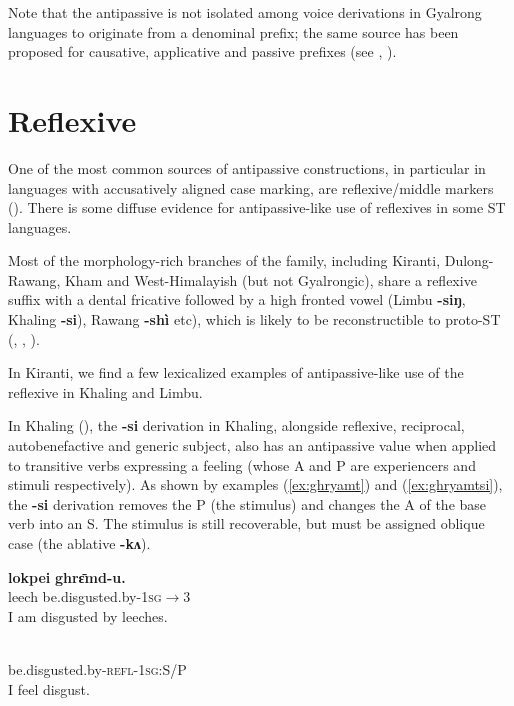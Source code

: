 \documentclass[oneside,a4paper,11pt]{article}
\newcommand{\ipa}[1]{{\phon\textbf{#1}}}
\begin{document}
Note that the antipassive is not isolated among voice derivations in Gyalrong languages to originate from a denominal prefix; the same source has been proposed for causative, applicative and passive prefixes (see \citealt{jacques15causative}, \citealt{lai18denom}).


\section{Reflexive}
One of the most common sources of antipassive constructions, in particular in languages with accusatively aligned case marking, are reflexive/middle markers (\citealt{janic16antipassif}). There is some diffuse evidence for antipassive-like use of reflexives in some ST languages.

Most of the morphology-rich branches of the family, including Kiranti, Dulong-Rawang, Kham and West-Himalayish (but not Gyalrongic), share a reflexive suffix with a dental fricative followed by a high fronted vowel (Limbu \ipa{-siŋ}, Khaling \ipa{-si}), Rawang \ipa{-shì} etc), which is likely to be reconstructible to proto-ST (\citealt[94]{bauman75}, \citealt[320]{driem93agreement}, \citealt{jacques16ssuffixes}).

In Kiranti, we find a few lexicalized examples of antipassive-like use of the reflexive in Khaling and Limbu.

In Khaling (\citealt{jacques16si}), the \ipa{-si} derivation in Khaling, alongside reflexive, reciprocal, autobenefactive and generic subject, also has an antipassive value when applied to transitive verbs expressing a feeling (whose A and P are experiencers and stimuli respectively). As shown by examples (\ref{ex:ghryamt})  and (\ref{ex:ghryamtsi}), the \ipa{-si} derivation removes the P (the stimulus) and changes the A of the base verb into an S. The stimulus is still recoverable, but must be assigned oblique case (the ablative \ipa{-kʌ}).  

\begin{exe}
\ex \label{ex:ghryamt} 
\gll 
  	\ipa{lokpei}  	\ipa{ghrɛ̄md-u.}  \\
leech  be.disgusted.by-\textsc{1sg$\rightarrow$3} \\
 \glt  I am disgusted by leeches.
\end{exe}

\begin{exe}
\ex \label{ex:ghryamtsi} 
\gll \ipa{gʰrɛ̄m-si-ŋʌ}\\
 be.disgusted.by-\textsc{refl-1sg:S/P} \\
\glt  I feel disgust.
\end{exe}
\end{document}
